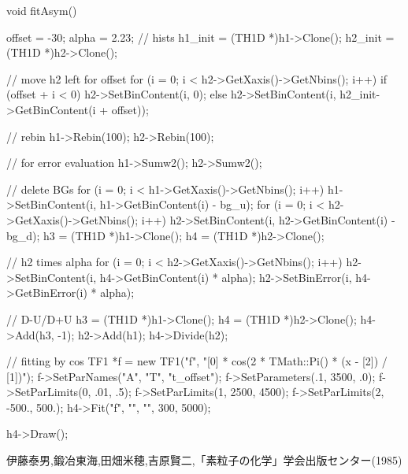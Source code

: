 \documentclass[dvipdfmx]{jsarticle}
\begin{document}
\begin{mylisting}[language=c++,caption=fitAsym.C]
void fitAsym()
{
    offset = -30;
    alpha = 2.23;
    // hists
    h1_init = (TH1D *)h1->Clone();
    h2_init = (TH1D *)h2->Clone();

    // move h2 left for offset
    for (i = 0; i < h2->GetXaxis()->GetNbins(); i++)
    {
        if (offset + i < 0)
        {
            h2->SetBinContent(i, 0);
        }
        else
        {
            h2->SetBinContent(i, h2_init->GetBinContent(i + offset));
        }
    }

    // rebin
    h1->Rebin(100);
    h2->Rebin(100);

    // for error evaluation
    h1->Sumw2();
    h2->Sumw2();

    // delete BGs
    for (i = 0; i < h1->GetXaxis()->GetNbins(); i++)
    {
        h1->SetBinContent(i, h1->GetBinContent(i) - bg_u);
    }
    for (i = 0; i < h2->GetXaxis()->GetNbins(); i++)
    {
        h2->SetBinContent(i, h2->GetBinContent(i) - bg_d);
    }
    h3 = (TH1D *)h1->Clone();
    h4 = (TH1D *)h2->Clone();

    // h2 times alpha
    for (i = 0; i < h2->GetXaxis()->GetNbins(); i++)
    {
        h2->SetBinContent(i, h4->GetBinContent(i) * alpha);
        h2->SetBinError(i, h4->GetBinError(i) * alpha);
    }

    // D-U/D+U
    h3 = (TH1D *)h1->Clone();
    h4 = (TH1D *)h2->Clone();
    h4->Add(h3, -1);
    h2->Add(h1);
    h4->Divide(h2);

    // fitting by cos
    TF1 *f = new TF1("f", "[0] * cos(2 * TMath::Pi() * (x - [2]) / [1])");
    f->SetParNames("A", "T", "t_offset");
    f->SetParameters(.1, 3500, .0);
    f->SetParLimits(0, .01, .5);
    f->SetParLimits(1, 2500, 4500);
    f->SetParLimits(2, -500., 500.);
    h4->Fit("f", "", "", 300, 5000);

    h4->Draw();
}
\end{mylisting}



\begin{thebibliography}{10}
     伊藤泰男,鍛冶東海,田畑米穂,吉原賢二,「素粒子の化学」学会出版センター(1985)
\end{thebibliography}
\end{document}
